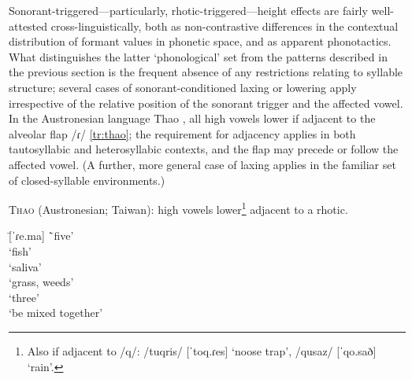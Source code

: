 Sonorant-triggered---particularly, rhotic-triggered---height effects are fairly well-attested cross-linguistically, both as non-contrastive differences in the contextual distribution of formant values in phonetic space, and as apparent phonotactics. What distinguishes the latter `phonological' set from the patterns described in the previous section is the frequent absence of any restrictions relating to syllable structure; several cases of sonorant-conditioned laxing or lowering apply irrespective of the relative position of the sonorant trigger and the affected vowel. In the Austronesian language Thao \citep[p.~264]{Blust2013}, all high vowels lower if adjacent to the alveolar flap /ɾ/ \cref{tr:thao}; the requirement for adjacency applies in both tautosyllabic and heterosyllabic contexts, and the flap may precede or follow the affected vowel. (A further, more general case of laxing applies in the familiar set of closed-syllable environments.)

\begin{example} \label{tr:thao}
  \textsc{Thao} (Austronesian; Taiwan): high vowels lower\footnote{Also if adjacent to /q/: /tuqris/ [ˈtoq.ɾes] `noose trap', /qusaz/ [ˈqo.sað] `rain'.} adjacent to a rhotic. \citep{Blust2013}
  \begin{tabbing}
   \tab[2cm] \= [ˈ{ɾ}e.ma] \tab[2cm] \= `five'\\
   \> [ˈ{ɾ}o.saw] \> `fish'\\
   \> [ˈi.{ɾ}oʃ] \> `saliva'\\
   \> [ɬmeɾ] \> `grass, weeds' \\
   \> [ˈto.ɾo] \> `three' \\
    \> `be mixed together'
    \end{tabbing}
\end{example}

